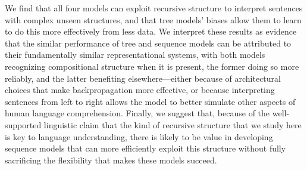 We find that all four models can exploit recursive structure to interpret sentences with complex unseen structures, and that tree models' biases allow them to learn to do this more effectively from less data. 
We interpret these results as evidence that the similar performance of tree and sequence models can be attributed to their fundamentally similar representational systems, with both models recognizing compositional structure when it is present, the former doing so more reliably, and the latter benefiting elsewhere---either because of architectural choices that make backpropagation more effective, or because interpreting sentences from left to right allows the model to better simulate other aspects of human language comprehension. Finally, we suggest that, because of the well-supported linguistic claim that the kind of recursive structure that we study here is key to language understanding, there is likely to be value in developing sequence models that can more efficiently exploit this structure without fully sacrificing the flexibility that makes these models succeed.
